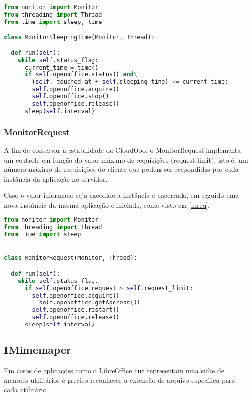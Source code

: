 {\singlespace
\begin{lstlisting}[caption=Método run da classe MonitorSleepingTime,language=python,label={mstime}]
from monitor import Monitor
from threading import Thread
from time import sleep, time

class MonitorSleepingTime(Monitor, Thread):

  def run(self):
    while self.status_flag:
      current_time = time()
      if self.openoffice.status() and\
        (self._touched_at + self.sleeping_time) <= current_time:
        self.openoffice.acquire()
        self.openoffice.stop()
        self.openoffice.release()
      sleep(self.interval)
\end{lstlisting}
}

\subsubsection{MonitorRequest}

A fim de conservar a estabilidade do CloudOoo, o MonitorRequest implementa um controle em função do valor máximo de requisições (\underline{request limit}), isto é, um número máximo de requisições do cliente que podem ser respondidas por cada instância da aplicação no servidor.

Caso o valor informado seja excedido a instância é encerrada, em seguido uma nova instância da mesma aplicação é iniciada, como visto em \ref{mreq}.

{\singlespace
\begin{lstlisting}[caption=Método run da classe MonitorRequest,language=python,label={mreq}]
from monitor import Monitor
from threading import Thread
from time import sleep


class MonitorRequest(Monitor, Thread):

  def run(self):
    while self.status_flag:
      if self.openoffice.request > self.request_limit:
        self.openoffice.acquire()
          self.openoffice.getAddress())
        self.openoffice.restart()
        self.openoffice.release()
      sleep(self.interval)
\end{lstlisting}
}

\subsection{IMimemaper}

Em casos de aplicações como o LibreOffice que representam uma suíte de menores utilitários é preciso reconhecer a extensão de arquivo específica para cada utilitário. 

